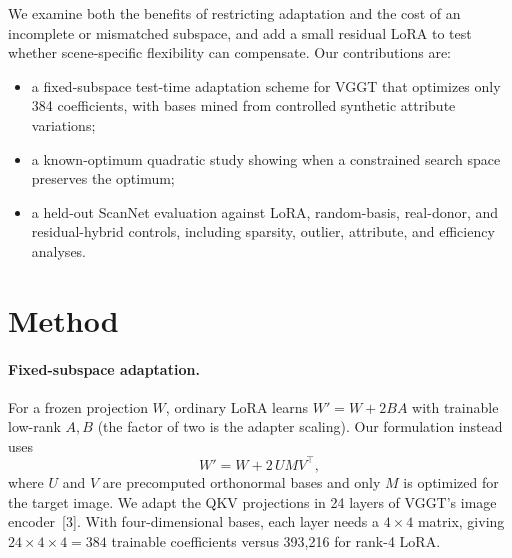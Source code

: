 \documentclass{article}
\begin{document}
We examine both the benefits of restricting adaptation and the cost of an incomplete or mismatched subspace, and add a small residual LoRA to test whether scene-specific flexibility can compensate. Our contributions are:
\begin{itemize}
\item a fixed-subspace test-time adaptation scheme for VGGT that optimizes only 384 coefficients, with bases mined from controlled synthetic attribute variations;
\item a known-optimum quadratic study showing when a constrained search space preserves the optimum;
\item a held-out ScanNet evaluation against LoRA, random-basis, real-donor, and residual-hybrid controls, including sparsity, outlier, attribute, and efficiency analyses.
\end{itemize}

\section{Method}

\paragraph{Fixed-subspace adaptation.} For a frozen projection $W$, ordinary LoRA learns $W' = W + 2BA$ with trainable low-rank $A, B$ (the factor of two is the adapter scaling). Our formulation instead uses
\begin{equation}
W' = W + 2\,U M V^\top,
\end{equation}
where $U$ and $V$ are precomputed orthonormal bases and only $M$ is optimized for the target image. We adapt the QKV projections in 24 layers of VGGT's image encoder~[3]. With four-dimensional bases, each layer needs a $4\times4$ matrix, giving $24\times4\times4=384$ trainable coefficients versus 393,216 for rank-4 LoRA.
\end{document}
